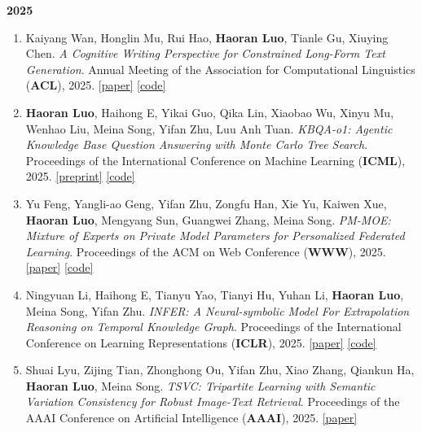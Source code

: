 \documentclass[letterpaper,11pt]{article}
\begin{document}
\vspace{0.5mm}
\textbf{2025}
\begin{enumerate}[series=resumeCounter, itemsep=0mm, topsep=2mm, leftmargin=*]
\item Kaiyang Wan, Honglin Mu, Rui Hao, \textbf{Haoran Luo}, Tianle Gu, Xiuying Chen. \emph{A Cognitive Writing Perspective for Constrained Long-Form Text Generation}. Annual Meeting of the Association for Computational Linguistics (\textbf{ACL}), 2025. \href{https://aclanthology.org/2025.findings-acl.511/}{[paper]} \href{https://github.com/KaiyangWan/CogWriter}{[code]}
\item \textbf{Haoran Luo}, Haihong E, Yikai Guo, Qika Lin, Xiaobao Wu, Xinyu Mu, Wenhao Liu, Meina Song, Yifan Zhu, Luu Anh Tuan. \emph{KBQA-o1: Agentic Knowledge Base Question Answering with Monte Carlo Tree Search}. Proceedings of the International Conference on Machine Learning (\textbf{ICML}), 2025. \href{https://arxiv.org/abs/2501.18922}{[preprint]} \href{https://github.com/LHRLAB/KBQA-o1}{[code]}
\item Yu Feng, Yangli-ao Geng, Yifan Zhu, Zongfu Han, Xie Yu, Kaiwen Xue, \textbf{Haoran Luo}, Mengyang Sun, Guangwei Zhang, Meina Song. \emph{PM-MOE: Mixture of Experts on Private Model Parameters for Personalized Federated Learning}. Proceedings of the ACM on Web Conference (\textbf{WWW}), 2025. \href{https://dl.acm.org/doi/abs/10.1145/3696410.3714561}{[paper]} \href{https://github.com/dannis97500/PM-MOE}{[code]}
\item Ningyuan Li, Haihong E, Tianyu Yao, Tianyi Hu, Yuhan Li, \textbf{Haoran Luo}, Meina Song, Yifan Zhu. \emph{INFER: A Neural-symbolic Model For Extrapolation Reasoning on Temporal Knowledge Graph}. Proceedings of the International Conference on Learning Representations (\textbf{ICLR}), 2025. \href{https://openreview.net/forum?id=ExHUtB2vnz}{[paper]} \href{https://github.com/JasonLee-22/INFER}{[code]}
\item Shuai Lyu, Zijing Tian, Zhonghong Ou, Yifan Zhu, Xiao Zhang, Qiankun Ha, \textbf{Haoran Luo}, Meina Song. \emph{TSVC: Tripartite Learning with Semantic Variation Consistency for Robust Image-Text Retrieval}. Proceedings of the AAAI Conference on Artificial Intelligence (\textbf{AAAI}), 2025. \href{https://ojs.aaai.org/index.php/AAAI/article/view/34121}{[paper]}
\end{enumerate}
\end{document}
